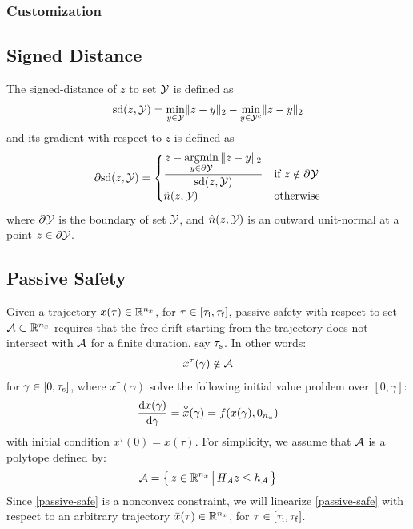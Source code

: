 \documentclass[11pt,a4paper]{article}
\begin{document}
\subsubsection{Customization}


\subsection{Signed Distance}

The signed-distance of $z$ to set $\mathcal{Y}$ is defined as
\begin{align}
    \mathrm{sd}(z,\mathcal{Y}) = \underset{y\in\mathcal{Y}}{\mathrm{min}}\|z-y\|_2 - \underset{y\in\mathcal{Y}^c}{\mathrm{min}}\|z-y\|_2\label{sgn-dist}
\end{align}
and its gradient with respect to $z$ is defined as 
\begin{align}
    \partial\mathrm{sd}(z,\mathcal{Y}) = \begin{cases}\displaystyle\frac{z-\underset{y\in\partial\mathcal{Y}}{\mathrm{argmin}}\,\|z-y\|_2}{\mathrm{sd}(z,\mathcal{Y})} &\text{if }z\notin\partial\mathcal{Y}\\\hat{n}(z,\mathcal{Y}) &\text{otherwise}\end{cases}\label{sgn-dist-jac}
\end{align}
where $\partial \mathcal{Y}$ is the boundary of set $\mathcal{Y}$, and $\hat{n}(z,\mathcal{Y})$ is an outward unit-normal at a point $z\in\partial\mathcal{Y}$.

\subsection{Passive Safety}

\newcommand{\deriv}[1]{\overset{\diamond}{#1}}

Given a trajectory $x(\tau)\in\mathbb{R}^{n_x}$, for $\tau\in[\tau_{\mathrm{i}},\tau_{\mathrm{f}}]$, passive safety with respect to set $\mathcal{A}\subset\mathbb{R}^{n_x}$ requires that the free-drift starting from the trajectory does not intersect with $\mathcal{A}$ for a finite duration, say $\tau_{\mathrm{s}}$. In other words:
\begin{align}
    x^\tau(\gamma) \notin \mathcal{A} \label{passive-safe}
\end{align}
for $\gamma\in[0,\tau_{\mathrm{s}}]$, where $x^\tau(\gamma)$ solve the following initial value problem over $[0,\gamma]$:
\begin{align}
    \frac{\mr{d}x(\gamma)}{\mr{d}\gamma} = \deriv{x}(\gamma) = f(x(\gamma),0_{n_u})\label{free-drift}
\end{align}
with initial condition $x^\tau(0) = x(\tau)$. For simplicity, we assume that $\mathcal{A}$ is a polytope defined by:
$$
    \mathcal{A} = \big\{\,z\in\mathbb{R}^{n_x}\,\big|\,H_{\mathcal{A}}z \le h_{\mathcal{A}}\,\big\}
$$
Since \eqref{passive-safe} is a nonconvex constraint, we will linearize \eqref{passive-safe} with respect to an arbitrary trajectory $\bar{x}(\tau)\in\mathbb{R}^{n_x}$, for $\tau\in[\tau_{\mathrm{i}},\tau_{\mathrm{f}}]$.
\end{document}
